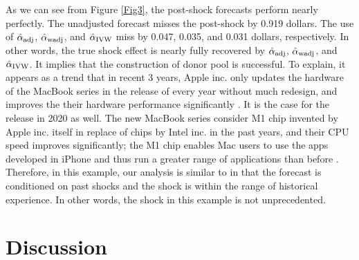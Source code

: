 \documentclass[11pt,3p,review,authoryear]{elsarticle}
\theoremstyle{definition}
\begin{document}
As we can see from Figure \ref{Fig3}, the post-shock forecasts perform nearly perfectly. The unadjusted forecast misses the post-shock by 0.919 dollars. The use of $\hat{\alpha}_{\rm adj}$, $\hat{\alpha}_{\rm wadj}$, and $\hat{\alpha}_{\rm IVW}$ miss by 0.047, 0.035, and 0.031 dollars, respectively. In other words, the true shock effect is nearly fully recovered by $\hat{\alpha}_{\rm adj}$, $\hat{\alpha}_{\rm wadj}$, and $\hat{\alpha}_{\rm IVW}$. It implies that the construction of donor pool is successful. To explain, it appears as a trend that in recent 3 years, Apple inc. only updates the hardware of the MacBook series in the release of every year without much redesign, and improves the their hardware performance significantly \citep{apple2017, apple2018, apple2019} . It is the case for the release in 2020 as well. The new MacBook series consider M1 chip invented by Apple inc. itself in replace of chips by Intel inc. in the past years, and their CPU speed improves significantly; the M1 chip enables  Mac users to use the apps developed in iPhone and thus run a greater range of applications than before \citep{apple2020}. Therefore, in this example, our analysis is similar to \cite{baumeister2014real} in that the  forecast is conditioned on past shocks and the shock is within the range of historical experience. In other words, the shock in this example is not unprecedented.

\section{Discussion}
\label{discussion}
\end{document}
